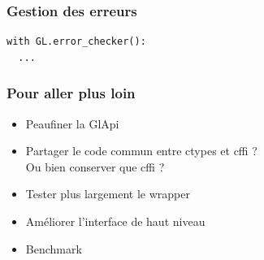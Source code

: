 \begin{frame}[fragile]
  \frametitle{Gestion des erreurs}
\begin{verbatim}
with GL.error_checker():
  ...
\end{verbatim}
\end{frame}

\begin{frame}
  \frametitle{Pour aller plus loin}
  \begin{itemize}
  \item Peaufiner la GlApi
  \item Partager le code commun entre ctypes et cffi ? \\
    Ou bien conserver que cffi ?
  \item Tester plus largement le wrapper
  \item Améliorer l'interface de haut niveau
  \item Benchmark
  \end{itemize}
\end{frame}


